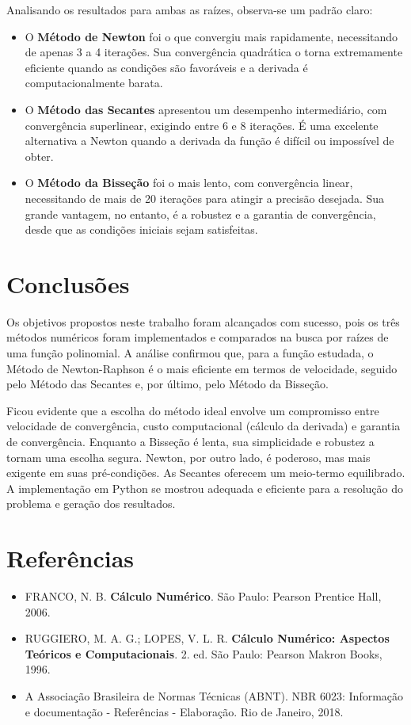 \documentclass[12pt, a4paper]{article}
\begin{document}
\noindent %
Analisando os resultados para ambas as raízes, observa-se um padrão claro:
\begin{itemize}
    \item O \textbf{Método de Newton} foi o que convergiu mais rapidamente, necessitando de apenas 3 a 4 iterações. Sua convergência quadrática o torna extremamente eficiente quando as condições são favoráveis e a derivada é computacionalmente barata.
    \item O \textbf{Método das Secantes} apresentou um desempenho intermediário, com convergência superlinear, exigindo entre 6 e 8 iterações. É uma excelente alternativa a Newton quando a derivada da função é difícil ou impossível de obter.
    \item O \textbf{Método da Bisseção} foi o mais lento, com convergência linear, necessitando de mais de 20 iterações para atingir a precisão desejada. Sua grande vantagem, no entanto, é a robustez e a garantia de convergência, desde que as condições iniciais sejam satisfeitas.
\end{itemize}

\section*{Conclusões}
Os objetivos propostos neste trabalho foram alcançados com sucesso, pois os três métodos numéricos foram implementados e comparados na busca por raízes de uma função polinomial. A análise confirmou que, para a função estudada, o Método de Newton-Raphson é o mais eficiente em termos de velocidade, seguido pelo Método das Secantes e, por último, pelo Método da Bisseção.

Ficou evidente que a escolha do método ideal envolve um compromisso entre velocidade de convergência, custo computacional (cálculo da derivada) e garantia de convergência. Enquanto a Bisseção é lenta, sua simplicidade e robustez a tornam uma escolha segura. Newton, por outro lado, é poderoso, mas mais exigente em suas pré-condições. As Secantes oferecem um meio-termo equilibrado. A implementação em Python se mostrou adequada e eficiente para a resolução do problema e geração dos resultados.

\section*{Referências}
\begin{itemize}
    \item FRANCO, N. B. \textbf{Cálculo Numérico}. São Paulo: Pearson Prentice Hall, 2006.
    \item RUGGIERO, M. A. G.; LOPES, V. L. R. \textbf{Cálculo Numérico: Aspectos Teóricos e Computacionais}. 2. ed. São Paulo: Pearson Makron Books, 1996.
    \item A Associação Brasileira de Normas Técnicas (ABNT). NBR 6023: Informação e documentação - Referências - Elaboração. Rio de Janeiro, 2018.
\end{itemize}
\end{document}
